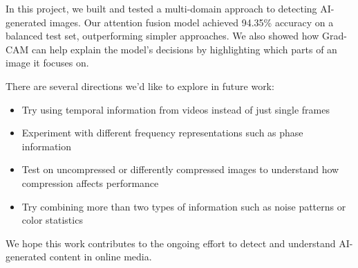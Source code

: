 \documentclass{article}
\begin{document}
In this project, we built and tested a multi-domain approach to detecting AI-generated images. Our attention fusion model achieved 94.35\% accuracy on a balanced test set, outperforming simpler approaches. We also showed how Grad-CAM can help explain the model's decisions by highlighting which parts of an image it focuses on.

There are several directions we'd like to explore in future work:
\begin{itemize}
  \item Try using temporal information from videos instead of just single frames
  \item Experiment with different frequency representations such as phase information
  \item Test on uncompressed or differently compressed images to understand how compression affects performance
  \item Try combining more than two types of information such as noise patterns or color statistics
\end{itemize}

We hope this work contributes to the ongoing effort to detect and understand AI-generated content in online media.
\end{document}
